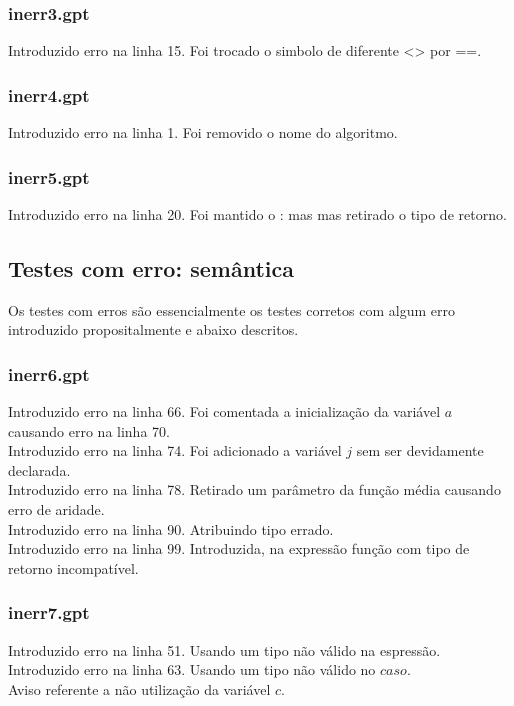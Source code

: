 \documentclass[a4paper,12pt]{report}
\begin{document}
\subsubsection{inerr3.gpt}

Introduzido erro na linha 15. Foi trocado o simbolo de diferente <> por ==.

\subsubsection{inerr4.gpt}

Introduzido erro na linha 1. Foi removido o nome do algoritmo.

\subsubsection{inerr5.gpt}

Introduzido erro na linha 20. Foi mantido o : mas mas retirado o tipo de retorno.

\subsection{Testes com erro: sem\^antica}

Os testes com erros s\~ao essencialmente os testes corretos com algum erro 
introduzido propositalmente e abaixo descritos.

\subsubsection{inerr6.gpt}

Introduzido erro na linha 66. Foi comentada a inicializa\c{c}\~ao da vari\'avel $a$ causando erro na linha 70.\\
Introduzido erro na linha 74. Foi adicionado a vari\'avel $j$ sem ser devidamente declarada.\\
Introduzido erro na linha 78. Retirado um par\^ametro da fun\c{c}\~ao m\'edia causando erro de aridade.\\
Introduzido erro na linha 90. Atribuindo tipo errado. \\
Introduzido erro na linha 99. Introduzida, na express\~ao fun\c{c}\~ao com tipo de retorno incompatível.

\subsubsection{inerr7.gpt}

Introduzido erro na linha 51. Usando um tipo n\~ao v\'alido na espress\~ao. \\
Introduzido erro na linha 63. Usando um tipo n\~ao v\'alido  no $caso$.\\
Aviso referente a n\~ao utiliza\c{c}\~ao da vari\'avel $c$.
\end{document}
